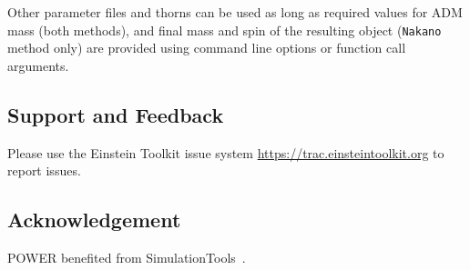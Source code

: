 Other parameter files and thorns can be used as long as required values for
ADM mass (both methods), and final mass and spin of the resulting object
(\texttt{Nakano} method only) are provided using command line options or
function call arguments.

\subsection{Support and Feedback}

Please use the Einstein Toolkit issue system
\url{https://trac.einsteintoolkit.org} to report issues.

\subsection{Acknowledgement}

POWER benefited from SimulationTools~\cite{POWER-SimulationTools:web}.

